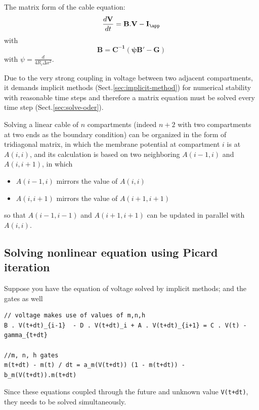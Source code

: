 The matrix form of the cable equation:
\begin{equation}
\frac{d{\bf V}}{dt} = \mathbf{B.V} - \mathbf{I_\app}
\end{equation}
with 
\begin{equation}
\mathbf{B = C^{-1} \left( \psi B' - G\right)}
\end{equation}
with $\psi = \frac{d}{4 R_i \Delta x^2}$.

Due to the very strong coupling in voltage between two adjacent compartments, it
demands implicit  methods  (Sect.\ref{sec:implicit-method}) for  numerical
stability with reasonable time steps  and  therefore a  matrix  equation  must 
be  solved  every  time  step (Sect.\ref{sec:solve-oder}).

\begin{mdframed}

Solving a linear cable of $n$ compartments (indeed $n+2$ with two compartments
at two ends as the boundary condition) can be organized in the form of
tridiagonal matrix, in which the membrane potential at compartment $i$ is at
$A(i,i)$, and its calculation is based on two neighboring $A(i-1,i)$ and
$A(i,i+1)$, in which 
\begin{itemize}
  \item $A(i-1,i)$ mirrors the value of $A(i,i)$
  \item $A(i,i+1)$ mirrors the value of $A(i+1,i+1)$
\end{itemize}
so that $A(i-1,i-1)$ and $A(i+1,i+1)$ can be updated in parallel with $A(i,i)$.

\end{mdframed}

\subsection{Solving nonlinear equation using Picard iteration}
\label{sec:iteration-solving-nonlinear-equation}
\label{sec:Picard-iteration}

Suppose you have the equation of voltage solved by implicit methods; and the
gates as well

\begin{verbatim}
// voltage makes use of values of m,n,h
B . V(t+dt)_{i-1}  - D . V(t+dt)_i + A . V(t+dt)_{i+1} = C . V(t) - gamma_{t+dt}

//m, n, h gates
m(t+dt) - m(t) / dt = a_m(V(t+dt)) (1 - m(t+dt)) - b_m(V(t+dt)).m(t+dt)  
\end{verbatim}

Since these equations coupled through the future and unknown value
\verb!V(t+dt)!, they needs to be solved simultaneously. 

